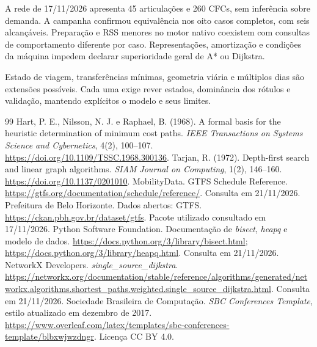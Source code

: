 \documentclass[12pt]{article}
\begin{document}
A rede de 17/11/2026 apresenta 45 articulações e 260 CFCs, sem inferência sobre demanda. A campanha confirmou equivalência nos oito casos completos, com seis alcançáveis. Preparação e RSS menores no motor nativo coexistem com consultas de comportamento diferente por caso. Representações, amortização e condições da máquina impedem declarar superioridade geral de A* ou Dijkstra.

Estado de viagem, transferências mínimas, geometria viária e múltiplos dias são extensões possíveis. Cada uma exige rever estados, dominância dos rótulos e validação, mantendo explícitos o modelo e seus limites.

\begin{thebibliography}{99}
 Hart, P. E., Nilsson, N. J. e Raphael, B. (1968). A formal basis for the heuristic determination of minimum cost paths. \emph{IEEE Transactions on Systems Science and Cybernetics}, 4(2), 100--107. \url{https://doi.org/10.1109/TSSC.1968.300136}.
 Tarjan, R. (1972). Depth-first search and linear graph algorithms. \emph{SIAM Journal on Computing}, 1(2), 146--160. \url{https://doi.org/10.1137/0201010}.
 MobilityData. GTFS Schedule Reference. \url{https://gtfs.org/documentation/schedule/reference/}. Consulta em 21/11/2026.
 Prefeitura de Belo Horizonte. Dados abertos: GTFS. \url{https://ckan.pbh.gov.br/dataset/gtfs}. Pacote utilizado consultado em 17/11/2026.
 Python Software Foundation. Documentação de \emph{bisect}, \emph{heapq} e modelo de dados. \url{https://docs.python.org/3/library/bisect.html}; \url{https://docs.python.org/3/library/heapq.html}. Consulta em 21/11/2026.
 NetworkX Developers. \emph{single\_source\_dijkstra}. \url{https://networkx.org/documentation/stable/reference/algorithms/generated/networkx.algorithms.shortest_paths.weighted.single_source_dijkstra.html}. Consulta em 21/11/2026.
 Sociedade Brasileira de Computação. \emph{SBC Conferences Template}, estilo atualizado em dezembro de 2017. \url{https://www.overleaf.com/latex/templates/sbc-conferences-template/blbxwjwzdngr}. Licença CC BY 4.0.
\end{thebibliography}
\end{document}
